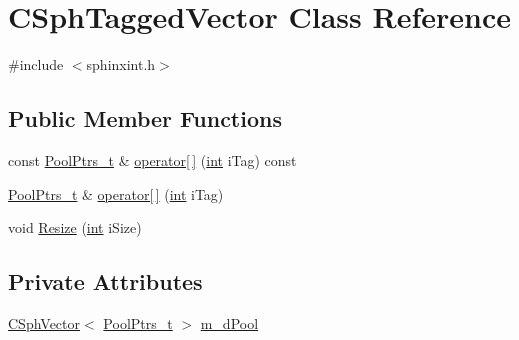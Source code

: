 \hypertarget{classCSphTaggedVector}{\section{C\-Sph\-Tagged\-Vector Class Reference}
\label{classCSphTaggedVector}
}


{\ttfamily \#include $<$sphinxint.\-h$>$}

\subsection*{Public Member Functions}
\begin{DoxyCompactItemize}
\item 
const \hyperlink{structPoolPtrs__t}{Pool\-Ptrs\-\_\-t} \& \hyperlink{classCSphTaggedVector_a4e90c1f286a799b41b3dbcbb1efafc9d}{operator\mbox{[}$\,$\mbox{]}} (\hyperlink{sphinxexpr_8cpp_a4a26e8f9cb8b736e0c4cbf4d16de985e}{int} i\-Tag) const 
\item 
\hyperlink{structPoolPtrs__t}{Pool\-Ptrs\-\_\-t} \& \hyperlink{classCSphTaggedVector_aa80b92c2bde7eb4580d0302421a3607d}{operator\mbox{[}$\,$\mbox{]}} (\hyperlink{sphinxexpr_8cpp_a4a26e8f9cb8b736e0c4cbf4d16de985e}{int} i\-Tag)
\item 
void \hyperlink{classCSphTaggedVector_a8fb6671efa1f2d80267d58d8f1a19db6}{Resize} (\hyperlink{sphinxexpr_8cpp_a4a26e8f9cb8b736e0c4cbf4d16de985e}{int} i\-Size)
\end{DoxyCompactItemize}
\subsection*{Private Attributes}
\begin{DoxyCompactItemize}
\item 
\hyperlink{classCSphVector}{C\-Sph\-Vector}$<$ \hyperlink{structPoolPtrs__t}{Pool\-Ptrs\-\_\-t} $>$ \hyperlink{classCSphTaggedVector_a19d2232fee96a8ddbfc2bf22c70bc658}{m\-\_\-d\-Pool}
\end{DoxyCompactItemize}


